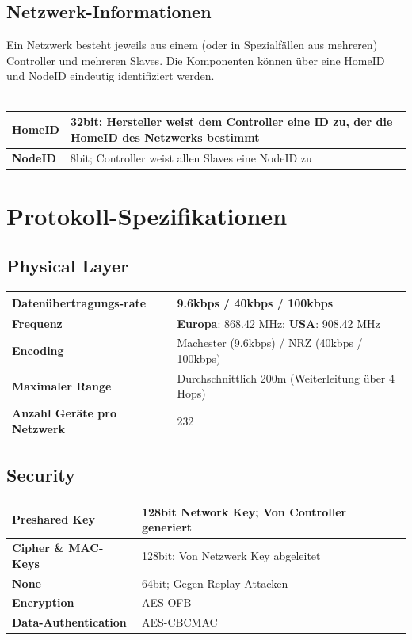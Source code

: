 \documentclass[a4paper,11pt]{article}
\begin{document}
\subsection*{Netzwerk-Informationen}
Ein Netzwerk besteht jeweils aus einem (oder in Spezialfällen aus mehreren) Controller und mehreren Slaves. Die Komponenten können über eine HomeID und NodeID eindeutig identifiziert werden.\\\\
{\renewcommand{\arraystretch}{1.5}
	\begin{tabular}{| p{3.5cm} | p{10cm} |}
		\hline
		\textbf{HomeID} & 32bit; Hersteller weist dem Controller eine ID zu, der die HomeID des Netzwerks bestimmt\\\hline
		\textbf{NodeID} & 8bit; Controller weist allen Slaves eine NodeID zu\\\hline
	\end{tabular}
}

\section*{Protokoll-Spezifikationen}

\subsection*{Physical Layer}
{\renewcommand{\arraystretch}{1.5}
	\begin{tabular}{| p{3.5cm} | p{10cm} |}
		\hline
		\textbf{Datenübertragungs-rate} & 9.6kbps / 40kbps / 100kbps\\\hline
		\textbf{Frequenz} &  {\textbf{Europa}: 868.42 MHz; \textbf{USA}: 908.42 MHz} \\\hline
		\textbf{Encoding} & Machester (9.6kbps) / NRZ (40kbps / 100kbps) \\\hline
		\textbf{Maximaler Range} & Durchschnittlich 200m (Weiterleitung über 4 Hops) \\\hline
		\textbf{Anzahl Geräte pro Netzwerk} & 232 \\\hline
	\end{tabular}
}

\subsection*{Security}
{\renewcommand{\arraystretch}{1.5}
	\begin{tabular}{| p{3.5cm} | p{10cm} |}
		\hline
		\textbf{Preshared Key} & 128bit Network Key; Von Controller generiert\\\hline
		\textbf{Cipher \& MAC-Keys} & 128bit; Von Netzwerk Key abgeleitet\\\hline
		\textbf{None} & 64bit; Gegen Replay-Attacken\\\hline
		\textbf{Encryption} & AES-OFB\\\hline
		\textbf{Data-Authentication} & AES-CBCMAC\\\hline
	\end{tabular}
}
\end{document}
